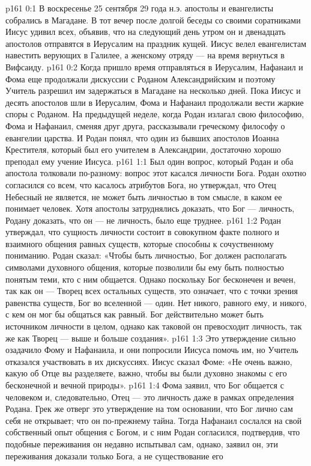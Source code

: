 \author{Комиссия срединников}
\vs p161 0:1 В воскресенье 25 сентября 29 года н.э. апостолы и евангелисты собрались в Магадане. В тот вечер после долгой беседы со своими соратниками Иисус удивил всех, объявив, что на следующий день утром он и двенадцать апостолов отправятся в Иерусалим на праздник кущей. Иисус велел евангелистам навестить верующих в Галилее, а женскому отряду --- на время вернуться в Вифсаиду.
\vs p161 0:2 Когда пришло время отправляться в Иерусалим, Нафанаил и Фома еще продолжали дискуссии с Роданом Александрийским и поэтому Учитель разрешил им задержаться в Магадане на несколько дней. Пока Иисус и десять апостолов шли в Иерусалим, Фома и Нафанаил продолжали вести жаркие споры с Роданом. На предыдущей неделе, когда Родан излагал свою философию, Фома и Нафанаил, сменяя друг друга, рассказывали греческому философу о евангелии царства. И Родан понял, что один из бывших апостолов Иоанна Крестителя, который был его учителем в Александрии, достаточно хорошо преподал ему учение Иисуса.
\vs p161 1:1 Был один вопрос, который Родан и оба апостола толковали по\hyp{}разному: вопрос этот касался личности Бога. Родан охотно согласился со всем, что касалось атрибутов Бога, но утверждал, что Отец Небесный не является, не может быть личностью в том смысле, в каком ее понимает человек. Хотя апостолы затруднялись доказать, что Бог --- личность, Родану доказать, что он --- не личность, было еще труднее.
\vs p161 1:2 Родан утверждал, что сущность личности состоит в совокупном факте полного и взаимного общения равных существ, которые способны к сочуственному пониманию. Родан сказал: «Чтобы быть личностью, Бог должен располагать символами духовного общения, которые позволили бы ему быть полностью понятым теми, кто с ним общается. Однако поскольку Бог бесконечен и вечен, так как он --- Творец всех остальных существ, это означает, что с точки зрения равенства существ, Бог во вселенной --- один. Нет никого, равного ему, и никого, с кем он мог бы общаться как равный. Бог действительно может быть источником личности в целом, однако как таковой он превосходит личность, так же как Творец --- выше и больше создания».
\vs p161 1:3 Это утверждение сильно озадачило Фому и Нафанаила, и они попросили Иисуса помочь им, но Учитель отказался участвовать в их дискуссиях. Иисус сказал Фоме: «Не очень важно, какую  об Отце вы разделяете, важно, чтобы вы были духовно знакомы с  его бесконечной и вечной природы».
\vs p161 1:4 Фома заявил, что Бог общается с человеком и, следовательно, Отец --- это личность даже в рамках определения Родана. Грек же отверг это утверждение на том основании, что Бог лично сам себя не открывает; что он по\hyp{}прежнему тайна. Тогда Нафанаил сослался на свой собственный опыт общения с Богом, и с ним Родан согласился, подтвердив, что подобные переживания он недавно испытывал сам, однако, заявил он, эти переживания доказали только  Бога, а не существование его 
